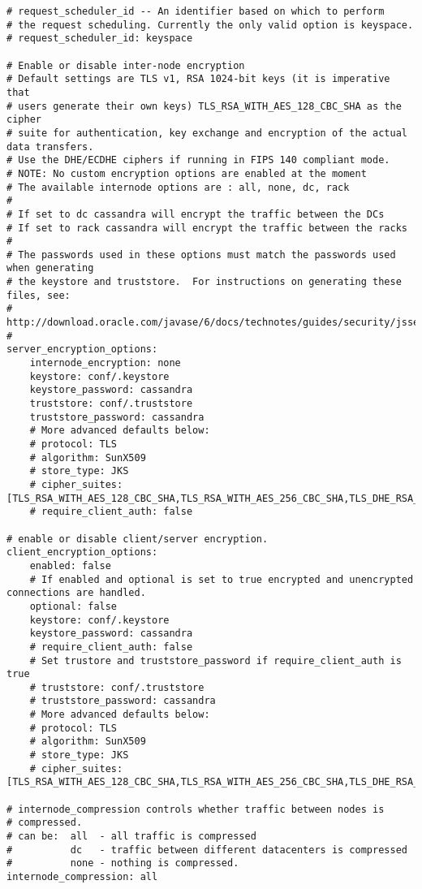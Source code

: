 \begin{verbatim}
# request_scheduler_id -- An identifier based on which to perform
# the request scheduling. Currently the only valid option is keyspace.
# request_scheduler_id: keyspace

# Enable or disable inter-node encryption
# Default settings are TLS v1, RSA 1024-bit keys (it is imperative that
# users generate their own keys) TLS_RSA_WITH_AES_128_CBC_SHA as the cipher
# suite for authentication, key exchange and encryption of the actual data transfers.
# Use the DHE/ECDHE ciphers if running in FIPS 140 compliant mode.
# NOTE: No custom encryption options are enabled at the moment
# The available internode options are : all, none, dc, rack
#
# If set to dc cassandra will encrypt the traffic between the DCs
# If set to rack cassandra will encrypt the traffic between the racks
#
# The passwords used in these options must match the passwords used when generating
# the keystore and truststore.  For instructions on generating these files, see:
# http://download.oracle.com/javase/6/docs/technotes/guides/security/jsse/JSSERefGuide.html#CreateKeystore
#
server_encryption_options:
    internode_encryption: none
    keystore: conf/.keystore
    keystore_password: cassandra
    truststore: conf/.truststore
    truststore_password: cassandra
    # More advanced defaults below:
    # protocol: TLS
    # algorithm: SunX509
    # store_type: JKS
    # cipher_suites: [TLS_RSA_WITH_AES_128_CBC_SHA,TLS_RSA_WITH_AES_256_CBC_SHA,TLS_DHE_RSA_WITH_AES_128_CBC_SHA,TLS_DHE_RSA_WITH_AES_256_CBC_SHA,TLS_ECDHE_RSA_WITH_AES_128_CBC_SHA,TLS_ECDHE_RSA_WITH_AES_256_CBC_SHA]
    # require_client_auth: false

# enable or disable client/server encryption.
client_encryption_options:
    enabled: false
    # If enabled and optional is set to true encrypted and unencrypted connections are handled.
    optional: false
    keystore: conf/.keystore
    keystore_password: cassandra
    # require_client_auth: false
    # Set trustore and truststore_password if require_client_auth is true
    # truststore: conf/.truststore
    # truststore_password: cassandra
    # More advanced defaults below:
    # protocol: TLS
    # algorithm: SunX509
    # store_type: JKS
    # cipher_suites: [TLS_RSA_WITH_AES_128_CBC_SHA,TLS_RSA_WITH_AES_256_CBC_SHA,TLS_DHE_RSA_WITH_AES_128_CBC_SHA,TLS_DHE_RSA_WITH_AES_256_CBC_SHA,TLS_ECDHE_RSA_WITH_AES_128_CBC_SHA,TLS_ECDHE_RSA_WITH_AES_256_CBC_SHA]

# internode_compression controls whether traffic between nodes is
# compressed.
# can be:  all  - all traffic is compressed
#          dc   - traffic between different datacenters is compressed
#          none - nothing is compressed.
internode_compression: all


\end{verbatim}

